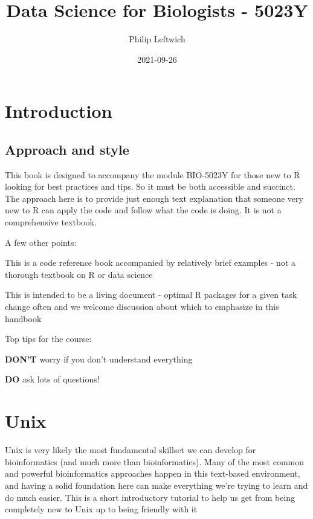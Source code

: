\documentclass[
]{book}
\title{Data Science for Biologists - 5023Y}
\author{Philip Leftwich}
\date{2021-09-26}
\begin{document}
\maketitle

{
\setcounter{tocdepth}{1}
\tableofcontents
}
\hypertarget{introduction}{%
\chapter{Introduction}\label{introduction}}

\hypertarget{approach-and-style}{%
\section{Approach and style}\label{approach-and-style}}

This book is designed to accompany the module BIO-5023Y for those new to R looking for best practices and tips. So it must be both accessible and succinct. The approach here is to provide just enough text explanation that someone very new to R can apply the code and follow what the code is doing. It is not a comprehensive textbook.

A few other points:

This is a code reference book accompanied by relatively brief examples - not a thorough textbook on R or data science

This is intended to be a living document - optimal R packages for a given task change often and we welcome discussion about which to emphasize in this handbook

Top tips for the course:

\textbf{DON'T} worry if you don't understand everything

\textbf{DO} ask lots of questions!

\citet{R-bookdown}

\hypertarget{Unix}{%
\chapter{Unix}\label{Unix}}

Unix is very likely the most fundamental skillset we can develop for bioinformatics (and much more than bioinformatics). Many of the most common and powerful bioinformatics approaches happen in this text-based environment, and having a solid foundation here can make everything we're trying to learn and do much easier. This is a short introductory tutorial to help us get from being completely new to Unix up to being friendly with it 🙂
\end{document}
